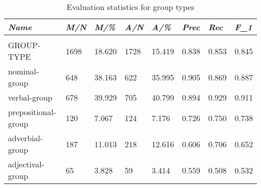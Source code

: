 \begin{table}[H]
	\centering
	\begin{tabulary}{\linewidth}{|L|l|l|l|l|l|l|l|}
		\hline
		\textit{Name}       & \textit{M/N} & \textit{M/\%} & \textit{A/N} & \textit{A/\%} & \textit{Prec} & \textit{Rec} & \textit{F_{1}} \\ \hline
		&              &              &              &              &               &              &             \\ \hline
		GROUP-TYPE          & 1698     & 18.620       & 1728     & 15.419       & 0.838         & 0.853        & 0.845       \\ \hline
		nominal-group       & 648      & 38.163       & 622      & 35.995       & 0.905         & 0.869        & 0.887       \\ \hline
		verbal-group        & 678      & 39.929       & 705      & 40.799       & 0.894         & 0.929        & 0.911       \\ \hline
		prepositional-group & 120      & 7.067        & 124      & 7.176        & 0.726         & 0.750        & 0.738       \\ \hline
		adverbial-group     & 187      & 11.013       & 218      & 12.616       & 0.606         & 0.706        & 0.652       \\ \hline
		adjectival-group    & 65       & 3.828        & 59       & 3.414        & 0.559         & 0.508        & 0.532       \\ \hline
	\end{tabulary}
	\caption{Evaluation statistics for group types}
	\label{tab:group-type-statistics}
\end{table}


